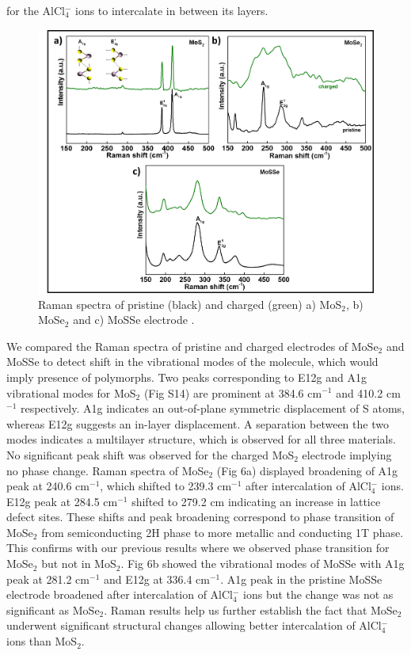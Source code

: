 \documentclass[num-refs]{wiley-article}
\begin{document}
for the AlCl$_4^-$ ions to intercalate in between its layers. 

\begin{figure}[h!]
\centering
\includegraphics[width=\textwidth]{figures/fig5}
\caption{Raman spectra of pristine (black) and charged (green) a) MoS$_2$, b) MoSe$_2$ and c) MoSSe electrode .}
\end{figure}

We compared the Raman spectra of pristine and charged electrodes of MoSe$_2$ and MoSSe to detect shift in the vibrational modes of the molecule, which would imply presence of polymorphs. Two peaks corresponding to E12g and A1g vibrational modes for MoS$_2$ (Fig S14) are prominent at 384.6 cm$^{-1}$ and 410.2 cm$^{-1}$ respectively. A1g indicates an out-of-plane symmetric displacement of S atoms, whereas E12g suggests an in-layer displacement. A separation between the two modes indicates a multilayer structure, which is observed for all three materials. No significant peak shift was observed for the charged MoS$_2$ electrode implying no phase change. Raman spectra of MoSe$_2$ (Fig 6a) displayed broadening of A1g peak at 240.6 cm$^{-1}$, which shifted to 239.3 cm$^{-1}$ after intercalation of AlCl$_4^-$ ions. E12g peak at 284.5 cm$^{-1}$ shifted to 279.2 cm indicating an increase in lattice defect sites. These shifts and peak broadening correspond to phase transition of MoSe$_2$ from semiconducting 2H phase to more metallic and conducting 1T phase. This confirms with our previous results where we observed phase transition for MoSe$_2$ but not in MoS$_2$. Fig 6b showed the vibrational modes of MoSSe with A1g peak at 281.2 cm$^{-1}$ and E12g at 336.4 cm$^{-1}$. A1g peak in the pristine MoSSe electrode broadened after intercalation of AlCl$_4^-$ ions but the change was not as significant as MoSe$_2$. Raman results help us further establish the fact that MoSe$_2$ underwent significant structural changes allowing better intercalation of AlCl$_4^-$ ions than MoS$_2$. 
\end{document}
